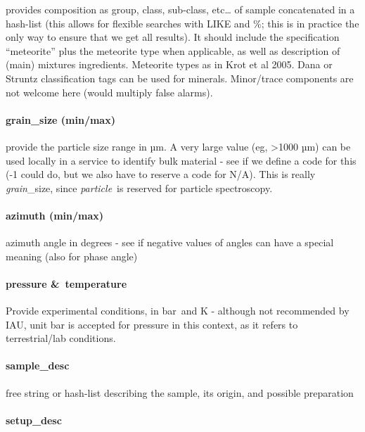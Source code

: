 \documentclass[11pt,a4paper]{ivoa}
\begin{document}
provides composition as group, class, sub-class, etc… of sample concatenated in a hash-list (this allows for flexible searches with LIKE and \%; this is in practice the only way to ensure that we get all results). It should include the specification ``meteorite'' plus the meteorite type when applicable, as well as description of (main) mixtures ingredients. Meteorite types as in Krot et al 2005. Dana or Struntz classification tags can be used for minerals. Minor/trace components are not welcome here (would multiply false alarms).

\paragraph{grain\_size (min/max)}

provide the particle size range in µm. A very large value (eg, >1000 µm) can be used locally in a service to identify bulk material - see if we define a code for this (-1 could do, but we also have to reserve a code for N/A). This is really \emph{grain}\_size, since \emph{particle} is reserved for particle spectroscopy.\\

\paragraph{azimuth (min/max)}

azimuth angle in degrees - see if negative values of angles can have a special meaning (also for phase angle)

\paragraph{pressure \& temperature}

Provide experimental conditions, in bar and K - although not recommended by IAU, unit bar is accepted for pressure in this context, as it refers to terrestrial/lab conditions.

\paragraph{sample\_desc}

free string or hash-list describing the sample, its origin, and possible preparation

\paragraph{setup\_desc}
\end{document}
